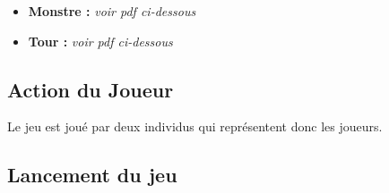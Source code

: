 \documentclass[12pt, letterpaper]{article}
\begin{document}
{\begin{itemize}
    Un terrain dispose d'un point d'apparition et leur nombre est variable en fonction du niveau de difficulté. Le maximum de ces points d'apparition est de trois. Chaque joueur possède un terrain et un seul, dont il est propriétaire.\newline
    Ces terrains peuvent être composés de différents types qui sont les suivants :
    \begin{itemize}
    \item[•] Montagne
    \item[•] Neige
    \item[•] Terre
    \item[•] Pluie
    \item[•] Plaine
    \item[•] Forêt
    \item[]
    \end{itemize}

    En option, l'utilisateur aura plusieurs choix possibles pour jouer.
    \begin{itemize}
    \item[•] Afficher ou non le quadrillage
    \item[•] Choisir la forme des cases qu'auront les cases du plateau, au choix : Carrées / Hexagonales
    \item[•] Choisir la carte en fonction de la difficulté choisie en début de partie
    \item[]
    \end{itemize}
\item
    \textbf{Monstre :} \textit{voir pdf ci-dessous}
\item
    \textbf{Tour :} \textit{voir pdf ci-dessous}
\end{itemize}



\clearpage
\BgThispage

\subsection{Action du Joueur}
Le jeu est joué par deux individus qui représentent donc les joueurs.

\subsection{Lancement du jeu}

}
\end{document}
